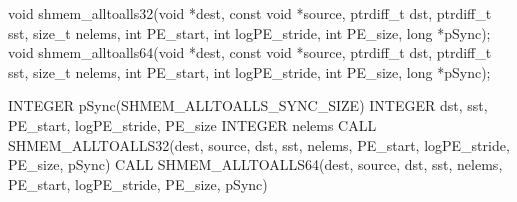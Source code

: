 
\begin{apidefinition}

\begin{Csynopsis}
void shmem_alltoalls32(void *dest, const void *source, ptrdiff_t dst, ptrdiff_t sst, size_t nelems, int PE_start, int logPE_stride, int PE_size, long *pSync);
void shmem_alltoalls64(void *dest, const void *source, ptrdiff_t dst, ptrdiff_t sst, size_t nelems, int PE_start, int logPE_stride, int PE_size, long *pSync);
\end{Csynopsis}

\begin{DeprecateBlock}
\begin{Fsynopsis}
INTEGER pSync(SHMEM_ALLTOALLS_SYNC_SIZE)
INTEGER dst, sst, PE_start, logPE_stride, PE_size
INTEGER nelems 
CALL SHMEM_ALLTOALLS32(dest, source, dst, sst, nelems, PE_start, logPE_stride, PE_size, pSync)
CALL SHMEM_ALLTOALLS64(dest, source, dst, sst, nelems, PE_start, logPE_stride, PE_size, pSync)
\end{Fsynopsis}
\end{DeprecateBlock}

\begin{apiarguments}


\end{apiarguments}
\end{apidefinition}
